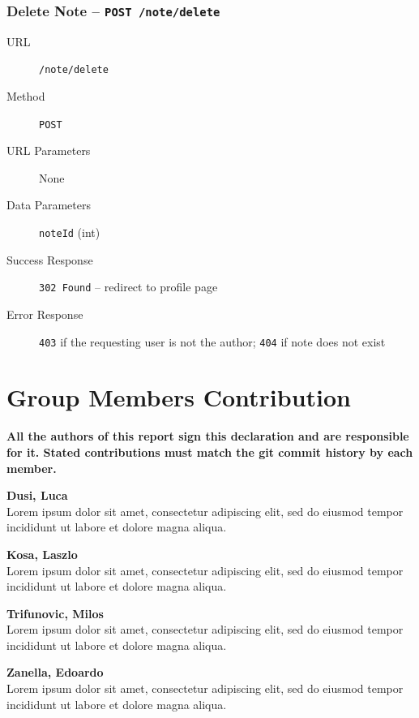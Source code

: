 \documentclass[12pt, a4paper]{article}
\begin{document}
    \subsubsection{Delete Note -- \texttt{POST /note/delete}}

    \begin{description}
        \item[URL] \texttt{/note/delete}
        \item[Method] \texttt{POST}
        \item[URL Parameters] None
        \item[Data Parameters] \texttt{noteId} (int)
        \item[Success Response] \texttt{302 Found} -- redirect to profile page
        \item[Error Response] \texttt{403} if the requesting user is not the author;
        \texttt{404} if note does not exist
    \end{description}%
    \newpage
    \section{Group Members Contribution}

    \noindent\textbf{All the authors of this report sign this declaration and are
    responsible for it. Stated contributions must match the git commit history
    by each member.}

    \bigskip

    \noindent\textbf{Dusi, Luca} \\
    Lorem ipsum dolor sit amet, consectetur adipiscing elit, sed do eiusmod tempor
    incididunt ut labore et dolore magna aliqua.

    \bigskip

    \noindent\textbf{Kosa, Laszlo} \\
    Lorem ipsum dolor sit amet, consectetur adipiscing elit, sed do eiusmod tempor
    incididunt ut labore et dolore magna aliqua.

    \bigskip

    \noindent\textbf{Trifunovic, Milos} \\
    Lorem ipsum dolor sit amet, consectetur adipiscing elit, sed do eiusmod tempor
    incididunt ut labore et dolore magna aliqua.

    \bigskip

    \noindent\textbf{Zanella, Edoardo} \\
    Lorem ipsum dolor sit amet, consectetur adipiscing elit, sed do eiusmod tempor
    incididunt ut labore et dolore magna aliqua.
\end{document}

